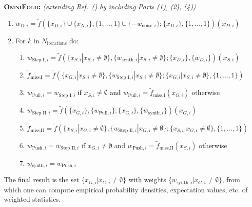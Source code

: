 \documentclass{article} %
\begin{document}
 \begin{tcolorbox}
 \textbf{\textsc{OmniFold}:} \textit{(extending Ref.~(\cite{Andreassen:2019cjw}) by including Parts (1), (2), (4))}


 \begin{enumerate}[wide, labelwidth=!, labelindent=0pt,label=(\roman*)]
 \item $w_{D,i}=\tilde{f}(\{x_{D,i}\}\cup\{x_{N,i}\},\{1,...,1\}\cup\{-w_{\text{noise},i}\};\{x_{D,i}\},\{1,...,1\})(x_{D,i})$
 \item For $k$ in $N_\text{iterations}$ do:
 	\begin{enumerate}[wide, labelwidth=!, labelindent=10pt]
		\item $w_{\text{Step I},i}=\tilde{f}(\{x_{S,i}|x_{S,i}\neq \emptyset\},\{w_{\text{synth},i}|x_{S,i}\neq \emptyset\};\{x_{D,i}\},\{w_{D,i}\})(x_{S,i})$
		\item $\tilde{f}_\text{miss,I}=\tilde{f}(\{x_{G,i}|x_{S,i}\neq \emptyset\},\{w_{\text{Step I},i}|x_{S,i}\neq \emptyset\};\{x_{G,i}|x_{S,i}\neq \emptyset\},\{1,...,1\})$
		\item $w_{\text{Pull},i}=w_{\text{Step I},i}$ if $x_{S,i}\neq \emptyset$ and $w_{\text{Pull},i}=\tilde{f}_\text{miss,I}(x_{G,i})$ otherwise
		\item $w_{\text{Step II},i}=\tilde{f}(\{x_{G,i}\},\{w_{\text{Pull},i}\};\{x_{G,i}\},\{w_{\text{synth},i}\})(x_{G,i})$
		\item $\tilde{f}_\text{miss,II}=\tilde{f}(\{x_{S,i}|x_{G,i}\neq \emptyset\},\{w_{\text{Step II},i}|x_{G,i}\neq \emptyset\};\{x_{S,i}|x_{G,i}\neq \emptyset\},\{1,...,1\})$
		\item $w_{\text{Push},i}=w_{\text{Step II},i}$ if $x_{G,i}\neq \emptyset$ and $w_{\text{Push},i}=\tilde{f}_\text{miss,II}(x_{S,i})$ otherwise
		\item $w_{\text{synth},i}=w_{\text{Push},i}$
	\end{enumerate}
 \end{enumerate}
 
 The final result is the set $\{x_{G,i}|x_{G,i}\neq \emptyset\}$ with weights $\{w_{\text{synth},i}|x_{G,i}\neq \emptyset\}$, from which one can compute empirical probability densities, expectation values, etc. of weighted statistics. 
 
 \end{tcolorbox}
 
\end{document}
